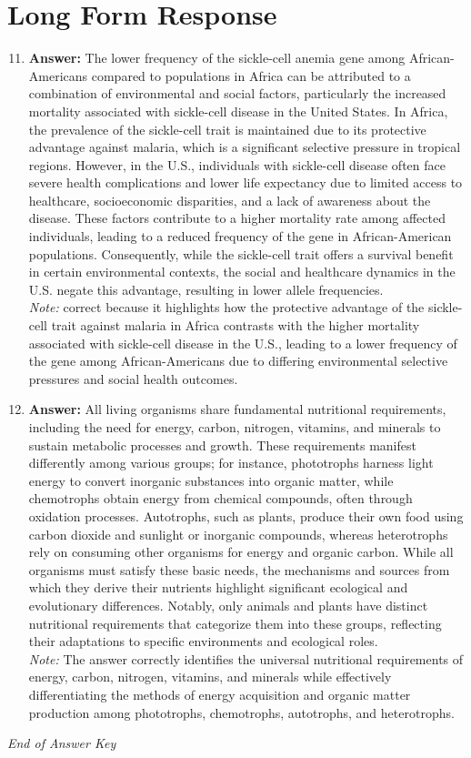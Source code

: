 \documentclass[12pt]{article}
\begin{document}
\section*{Long Form Response}
\begin{enumerate}[label=\arabic*.]
\setcounter{enumi}{10}
\item \textbf{Answer:} The lower frequency of the sickle-cell anemia gene among African-Americans compared to populations in Africa can be attributed to a combination of environmental and social factors, particularly the increased mortality associated with sickle-cell disease in the United States. In Africa, the prevalence of the sickle-cell trait is maintained due to its protective advantage against malaria, which is a significant selective pressure in tropical regions. However, in the U.S., individuals with sickle-cell disease often face severe health complications and lower life expectancy due to limited access to healthcare, socioeconomic disparities, and a lack of awareness about the disease. These factors contribute to a higher mortality rate among affected individuals, leading to a reduced frequency of the gene in African-American populations. Consequently, while the sickle-cell trait offers a survival benefit in certain environmental contexts, the social and healthcare dynamics in the U.S. negate this advantage, resulting in lower allele frequencies.
\\ \textit{Note:} correct because it highlights how the protective advantage of the sickle-cell trait against malaria in Africa contrasts with the higher mortality associated with sickle-cell disease in the U.S., leading to a lower frequency of the gene among African-Americans due to differing environmental selective pressures and social health outcomes.
\item \textbf{Answer:} All living organisms share fundamental nutritional requirements, including the need for energy, carbon, nitrogen, vitamins, and minerals to sustain metabolic processes and growth. These requirements manifest differently among various groups; for instance, phototrophs harness light energy to convert inorganic substances into organic matter, while chemotrophs obtain energy from chemical compounds, often through oxidation processes. Autotrophs, such as plants, produce their own food using carbon dioxide and sunlight or inorganic compounds, whereas heterotrophs rely on consuming other organisms for energy and organic carbon. While all organisms must satisfy these basic needs, the mechanisms and sources from which they derive their nutrients highlight significant ecological and evolutionary differences. Notably, only animals and plants have distinct nutritional requirements that categorize them into these groups, reflecting their adaptations to specific environments and ecological roles.
\\ \textit{Note:} The answer correctly identifies the universal nutritional requirements of energy, carbon, nitrogen, vitamins, and minerals while effectively differentiating the methods of energy acquisition and organic matter production among phototrophs, chemotrophs, autotrophs, and heterotrophs.
\end{enumerate}

\vfill
\noindent\textit{End of Answer Key}
\end{document}
